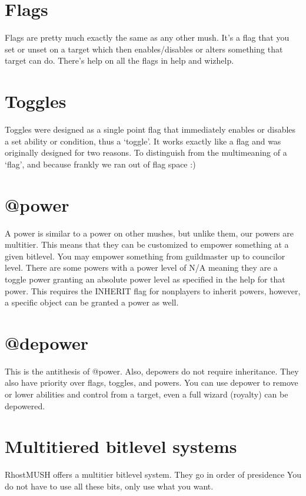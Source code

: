 \documentclass[letterpaper,10pt,english]{sphinxmanual}
\begin{document}
\section{Flags}
\label{\detokenize{toggles:flags}}
\sphinxAtStartPar
Flags are pretty much exactly the same as any other mush.  It’s a flag
that you set or unset on a target which then enables/disables or
alters something that target can do.  There’s help on all the flags
in help and wizhelp.


\section{Toggles}
\label{\detokenize{toggles:toggles}}
\sphinxAtStartPar
Toggles were designed as a single point flag that immediately enables
or disables a set ability or condition, thus a ‘toggle’.  It works
exactly like a flag and was originally designed for two reasons.  To
distinguish from the multi\sphinxhyphen{}meaning of a ‘flag’, and because frankly
we ran out of flag space :)


\section{@power}
\label{\detokenize{toggles:power}}
\sphinxAtStartPar
A power is similar to a power on other mushes, but unlike them, our
powers are multi\sphinxhyphen{}tier.  This means that they can be customized to
empower something at a given bitlevel.  You may empower something
from guildmaster up to councilor level.  There are some powers
with a power level of N/A meaning they are a toggle power granting
an absolute power level as specified in the help for that power.
This requires the INHERIT flag for non\sphinxhyphen{}players to inherit powers,
however, a specific object can be granted a power as well.


\section{@depower}
\label{\detokenize{toggles:depower}}
\sphinxAtStartPar
This is the anti\sphinxhyphen{}thesis of @power.  Also, depowers do not require
inheritance.  They also have priority over flags, toggles, and
powers.  You can use depower to remove or lower abilities and
control from a target, even a full wizard (royalty) can be
depowered.


\section{Multi\sphinxhyphen{}tiered bitlevel systems}
\label{\detokenize{toggles:multi-tiered-bitlevel-systems}}
\sphinxAtStartPar
RhostMUSH offers a multi\sphinxhyphen{}tier bitlevel system.  They go in order of presidence
You do not have to use all these bits, only use what you want.
\end{document}
